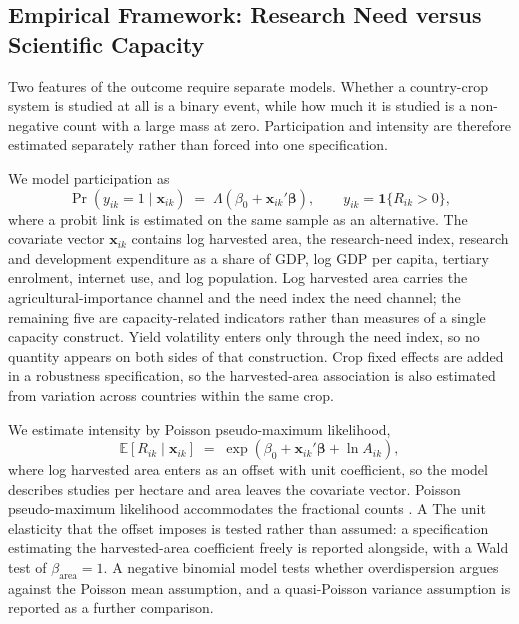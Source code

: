 \documentclass[ASNA,twocolumn]{USG}
\begin{document}
\subsection{Empirical Framework: Research Need versus Scientific Capacity}\label{sec:framework}

Two features of the outcome require separate models. Whether a country-crop system is studied
at all is a binary event, while how much it is studied is a non-negative count with a large
mass at zero. Participation and intensity are therefore estimated separately rather than
forced into one specification.

We model participation as
\begin{equation}
\Pr(y_{ik}=1 \mid \mathbf{x}_{ik}) \;=\; \Lambda\!\left(\beta_{0} + \mathbf{x}_{ik}'\boldsymbol{\beta}\right),
\qquad y_{ik} = \mathbf{1}\{R_{ik}>0\},
\label{eq:logit}
\end{equation}
where a probit link is estimated on the same sample
as an alternative. The covariate vector $\mathbf{x}_{ik}$ contains log harvested area, the
research-need index, research and development expenditure as a share of GDP, log GDP per
capita, tertiary enrolment, internet use, and log population. Log harvested area carries the
agricultural-importance channel and the need index the need channel; the remaining five are
capacity-related indicators rather than measures of a single capacity construct. Yield
volatility enters only through the need index, so no quantity appears on both sides of that
construction. Crop fixed effects are added in a robustness specification, so the
harvested-area association is also estimated from variation across countries within the same
crop.

We estimate intensity by Poisson pseudo-maximum likelihood,
\begin{equation}
\mathbb{E}\!\left[R_{ik} \mid \mathbf{x}_{ik}\right] \;=\;
\exp\!\left(\beta_{0} + \mathbf{x}_{ik}'\boldsymbol{\beta} + \ln A_{ik}\right),
\label{eq:ppml}
\end{equation}
where log harvested area enters as an offset with unit coefficient, so the model describes
studies per hectare and area leaves the covariate vector. Poisson pseudo-maximum likelihood accommodates the fractional counts \cite{SilvaTenreyro2006}. A
The unit elasticity that the offset imposes is tested rather than assumed: a specification
estimating the harvested-area coefficient freely is reported alongside, with a Wald test of
$\beta_{\text{area}} = 1$. A negative binomial model tests whether overdispersion argues against
the Poisson mean assumption, and a quasi-Poisson variance assumption is reported as a further
comparison.
\end{document}
